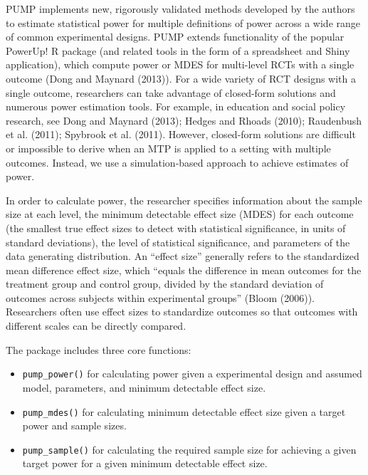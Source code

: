 \documentclass[
]{article}
\providecommand{\tightlist}{%
  \setlength{\itemsep}{0pt}\setlength{\parskip}{0pt}}
\begin{document}
PUMP implements new, rigorously validated methods developed by the
authors to estimate statistical power for multiple definitions of power
across a wide range of common experimental designs. PUMP extends
functionality of the popular PowerUp! R package (and related tools in
the form of a spreadsheet and Shiny application), which compute power or
MDES for multi-level RCTs with a single outcome (Dong and Maynard
(2013)). For a wide variety of RCT designs with a single outcome,
researchers can take advantage of closed-form solutions and numerous
power estimation tools. For example, in education and social policy
research, see Dong and Maynard (2013); Hedges and Rhoads (2010);
Raudenbush et al. (2011); Spybrook et al. (2011). However, closed-form
solutions are difficult or impossible to derive when an MTP is applied
to a setting with multiple outcomes. Instead, we use a simulation-based
approach to achieve estimates of power.

In order to calculate power, the researcher specifies information about
the sample size at each level, the minimum detectable effect size (MDES)
for each outcome (the smallest true effect sizes to detect with
statistical significance, in units of standard deviations), the level of
statistical significance, and parameters of the data generating
distribution. An ``effect size'' generally refers to the standardized
mean difference effect size, which ``equals the difference in mean
outcomes for the treatment group and control group, divided by the
standard deviation of outcomes across subjects within experimental
groups'' (Bloom (2006)). Researchers often use effect sizes to
standardize outcomes so that outcomes with different scales can be
directly compared.

The package includes three core functions:

\begin{itemize}
\tightlist
\item
  \texttt{pump\_power()} for calculating power given a experimental
  design and assumed model, parameters, and minimum detectable effect
  size.
\item
  \texttt{pump\_mdes()} for calculating minimum detectable effect size
  given a target power and sample sizes.
\item
  \texttt{pump\_sample()} for calculating the required sample size for
  achieving a given target power for a given minimum detectable effect
  size.
\end{itemize}
\end{document}

